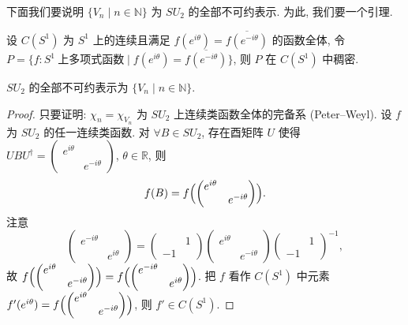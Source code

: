 下面我们要说明 $\{V_n\mid n\in\mathbb{N}\}$ 为 $SU_2$ 的全部不可约表示.
为此, 我们要一个引理.

\begin{lemma}\label{lem:stone-weierstrass}
设 $C(S^1)$ 为 $S^1$ 上的连续且满足 $f(e^{i\theta})=\overline{f(e^{-i\theta})}$ 的函数全体, 令
$P=\{f\colon S^1\ \text{上多项式函数}\mid f(e^{i\theta})=\overline{f(e^{-i\theta})}\}$,
则 $P$ 在 $C(S^1)$ 中稠密.
\end{lemma}

\begin{theorem}\label{thm:SU2-classification}
$SU_2$ 的全部不可约表示为 $\{V_n\mid n\in\mathbb{N}\}$.
\end{theorem}

\begin{proof}
只要证明: $\chi_n=\chi_{V_n}$ 为 $SU_2$ 上连续类函数全体的完备系 (Peter--Weyl).
设 $f$ 为 $SU_2$ 的任一连续类函数. 对 $\forall B\in SU_2$, 存在酉矩阵 $U$ 使得
$UBU^{\dagger}=\begin{pmatrix}e^{i\theta}&\\&e^{-i\theta}\end{pmatrix}$, $\theta\in\mathbb{R}$, 则
\[
  f(B)=f\Bigl(\begin{pmatrix}e^{i\theta}&\\&e^{-i\theta}\end{pmatrix}\Bigr).
\]
注意
\[
  \begin{pmatrix}e^{-i\theta}&\\&e^{i\theta}\end{pmatrix}
  =\begin{pmatrix}&1\\-1&\end{pmatrix}
  \begin{pmatrix}e^{i\theta}&\\&e^{-i\theta}\end{pmatrix}
  \begin{pmatrix}&1\\-1&\end{pmatrix}^{-1},
\]
故 $f\Bigl(\begin{pmatrix}e^{i\theta}&\\&e^{-i\theta}\end{pmatrix}\Bigr)
=f\Bigl(\begin{pmatrix}e^{-i\theta}&\\&e^{i\theta}\end{pmatrix}\Bigr)$.
把 $f$ 看作 $C(S^1)$ 中元素 $f'(e^{i\theta})=f\Bigl(\begin{pmatrix}e^{i\theta}&\\&e^{-i\theta}\end{pmatrix}\Bigr)$,
则 $f'\in C(S^1)$.


\end{proof}
